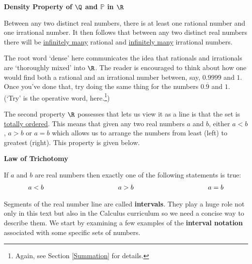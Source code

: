 \documentclass{ximera}
\begin{document}
\medskip

\label{densityofqandp}

\colorbox{ResultColor}{\bbm

\centerline{\textbf{Density Property of $\Q$ and $\mathbb P$ in $\R$}}

Between any two distinct real numbers, there is at least one rational number and one irrational number.  It then follows that between any two distinct real numbers there will be \underline{infinitely many} rational and \underline{infinitely many} irrational numbers.

\ebm}

\medskip

The root word `dense' here communicates the idea that rationals and irrationals are `thoroughly mixed' into $\R$.   The reader is encouraged to think about how one would find both a rational and an irrational number between, say, $0.9999$ and $1$. Once you've done that, try doing the same thing for the numbers $0.\overline{9}$ and $1$. (`Try' is the operative word, here.\footnote{Again, see Section \ref{Summation} for details.})

\smallskip

The second property $\R$ possesses that lets us view it as a line is that the set is \href{http://en.wikipedia.org/wiki/Total_order}{\underline{totally ordered}}. This means that given any two real numbers $a$ and $b$, either $a < b$, $a > b$ or $a = b$ which allows us to arrange the numbers from least (left) to greatest (right). This property is given below.

\medskip

\label{trichotomy}

\colorbox{ResultColor}{\bbm

\centerline{\textbf{Law of Trichotomy}}

If $a$ and $b$ are real numbers then exactly one of the following statements is true: \vspace{-.15in} \[ \begin{array}{lclcl} a < b & \hspace*{1.25in} & a > b & \hspace*{1.25in} & a = b \end{array} \]

\ebm}

\medskip

Segments of the real number line are called \textbf{intervals}.  They play a huge role not only in this text but also in the Calculus curriculum so we need a concise way to describe them.  We start by examining a few examples of the \textbf{interval notation} associated with some specific sets of numbers.  
\end{document}
